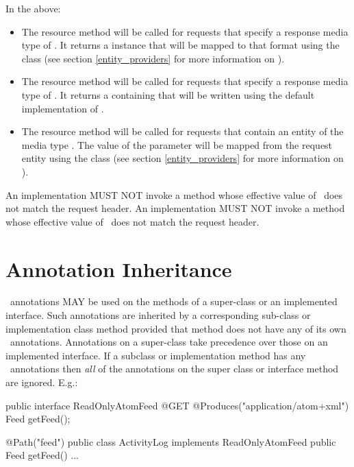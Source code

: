 In the above:
\begin{itemize}
\item The  resource method will be called for  requests that specify a response media type of . It returns a  instance that will be mapped to that format using the  class (see section \ref{entity_providers} for more information on \MsgWrite).
\item The  resource method will be called for  requests that specify a response media type of . It returns a  containing  that will be written using the default implementation of .
\item The  resource method will be called for  requests that contain an entity of the media type . The value of the  parameter will be mapped from the request entity using the  class (see section \ref{entity_providers} for more information on \MsgRead).
\end{itemize}

An implementation MUST NOT invoke a method whose effective value of \Produces\ does not match the request  header. An implementation MUST NOT invoke a method whose effective value of \Consumes\ does not match the request  header.

\section{Annotation Inheritance}
\label{annotationinheritance}

\jaxrs\ annotations MAY be used on the methods of a super-class or an implemented interface. Such annotations are inherited by a corresponding sub-class or implementation class method provided that method does not have any of its own \jaxrs\ annotations. Annotations on a super-class take precedence over those on an implemented interface. If a subclass or implementation method has any \jaxrs\ annotations then {\em all} of the annotations on the super class or interface method are ignored. E.g.:

\begin{listing}{1}
public interface ReadOnlyAtomFeed {
  @GET @Produces("application/atom+xml")
  Feed getFeed();
}

@Path("feed")
public class ActivityLog implements ReadOnlyAtomFeed {
  public Feed getFeed() {...}
}
\end{listing}

